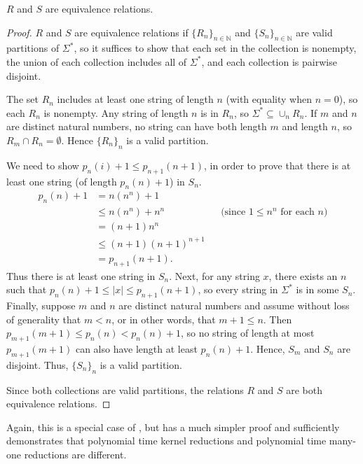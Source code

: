 \begin{lemma}
  $R$ and $S$ are equivalence relations.
\end{lemma}
\begin{proof}
  $R$ and $S$ are equivalence relations if $\{R_n\}_{n \in \mathbb{N}}$ and $\{S_n\}_{n \in \mathbb{N}}$ are valid partitions of $\Sigma^*$, so it suffices to show that each set in the collection is nonempty, the union of each collection includes all of $\Sigma^*$, and each collection is pairwise disjoint.

  The set $R_n$ includes at least one string of length $n$ (with equality when $n = 0$), so each $R_n$ is nonempty.
  Any string of length $n$ is in $R_n$, so $\Sigma^* \subseteq \cup_n R_n$.
  If $m$ and $n$ are distinct natural numbers, no string can have both length $m$ and length $n$, so $R_m \cap R_n = \emptyset$.
  Hence $\{R_n\}_n$ is a valid partition.

  We need to show $p_n(i) + 1 \leq p_{n + 1}(n + 1)$, in order to prove that there is at least one string (of length $p_n(n) + 1$) in $S_n$.
  \begin{align*}
    p_n(n) + 1 &= n (n^n) + 1 \\
    &\leq n (n^n) + n^n && \text{(since } 1 \leq n^n \text{ for each } n \text{)} \\
    &= (n + 1) n^n \\
    &\leq (n + 1) (n + 1)^{n + 1} \\
    &= p_{n + 1}(n + 1).
  \end{align*}
  Thus there is at least one string in $S_n$.
  Next, for any string $x$, there exists an $n$ such that $p_n(n) + 1 \leq |x| \leq p_{n + 1}(n + 1)$, so every string in $\Sigma^*$ is in some $S_n$.
  Finally, suppose $m$ and $n$ are distinct natural numbers and assume without loss of generality that $m < n$, or in other words, that $m + 1 \leq n$.
  Then $p_{m + 1}(m + 1) \leq p_n(n) < p_n(n) + 1$, so no string of length at most $p_{m + 1}(m + 1)$ can also have length at least $p_n(n) + 1$.
  Hence, $S_m$ and $S_n$ are disjoint.
  Thus, $\{S_n\}_n$ is a valid partition.

  Since both collections are valid partitions, the relations $R$ and $S$ are both equivalence relations.
\end{proof}

Again, this is a special case of \autocite[Theorem~5.1]{bcffm}, but has a much simpler proof and sufficiently demonstrates that polynomial time kernel reductions and polynomial time many-one reductions are different.

